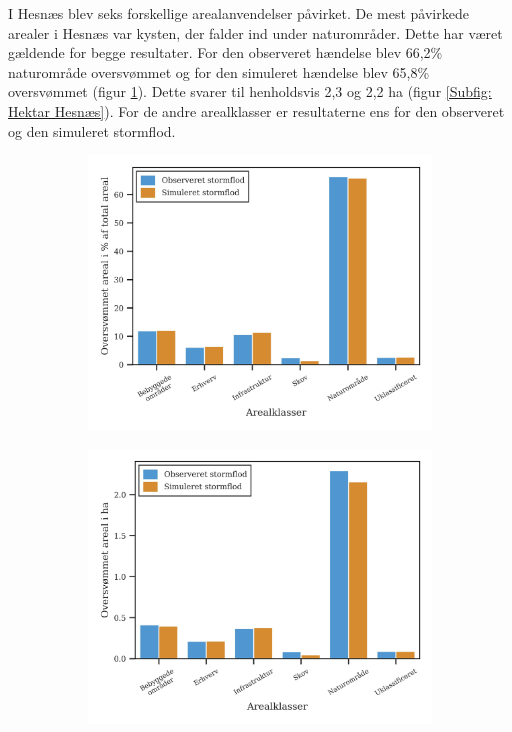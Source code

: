 I Hesnæs blev seks forskellige arealanvendelser påvirket. De mest påvirkede arealer i Hesnæs var kysten, der falder ind under naturområder. Dette har været gældende for begge resultater. For den observeret hændelse blev 66,2\% naturområde oversvømmet og for den simuleret hændelse blev 65,8\% oversvømmet (figur \ref{Subfig: Procent hesnæs}). Dette svarer til henholdsvis 2,3 og 2,2 ha (figur \ref{Subfig: Hektar Hesnæs}). For de andre arealklasser er resultaterne ens for den observeret og den simuleret stormflod. 
\begin{figure}[H]
    \begin{subfigure}[b]{0.5\textwidth}
        \centering
        \includegraphics[width=1\linewidth]{images/Resultater/areal_anvendelses_grafer/hesnaes_arealanvendelse.jpg}
        \caption{}
        \label{Subfig: Procent hesnæs}
    \end{subfigure}
    \begin{subfigure}[b]{0.5\textwidth}
        \centering
        \includegraphics[width=1\linewidth]{images/Resultater/areal_anvendelses_grafer/hesnaes_oversvommet_Hektar.jpg}

\end{subfigure}
\end{figure}
